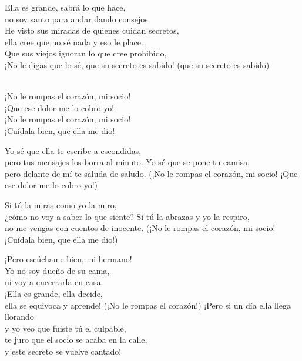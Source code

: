 \begin{lyrics}

Ella es grande, sabrá lo que hace,\\
no soy santo para andar dando consejos.\\
He visto sus miradas de quienes cuidan secretos,\\
ella cree que no sé nada y eso le place.\\
Que sus viejos ignoran lo que cree prohibido,\\
¡No le digas que lo sé, que su secreto es sabido!
(que su secreto es sabido)

\\
¡No le rompas el corazón, mi socio!\\
¡Que ese dolor me lo cobro yo!\\
¡No le rompas el corazón, mi socio!\\
¡Cuídala bien, que ella me dio!

 Yo sé que ella te escribe a escondidas,\\
pero tus mensajes los borra al minuto.
 Yo sé que se pone tu camisa,\\
pero delante de mí te saluda de saludo.
 (¡No le rompas el corazón, mi socio! ¡Que ese dolor me lo cobro yo!)

 Si tú la miras como yo la miro,\\
¿cómo no voy a saber lo que siente?
 Si tú la abrazas y yo la respiro,\\
no me vengas con cuentos de inocente.
 (¡No le rompas el corazón, mi socio! ¡Cuídala bien, que ella me dio!)

 ¡Pero escúchame bien, mi hermano!\\
Yo no soy dueño de su cama,\\
ni voy a encerrarla en casa.\\
¡Ella es grande, ella decide,\\
ella se equivoca y aprende!
 (¡No le rompas el corazón!)
 ¡Pero si un día ella llega llorando\\
y yo veo que fuiste tú el culpable,\\
te juro que el socio se acaba en la calle,\\
y este secreto se vuelve cantado!


\end{lyrics}
